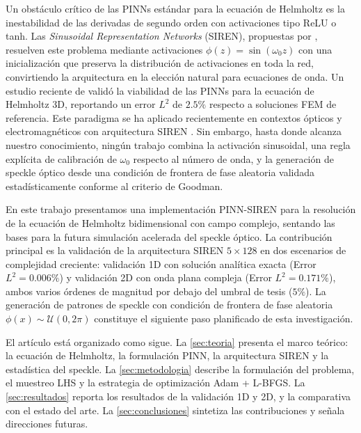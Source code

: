 Un obstáculo crítico de las PINNs estándar para la ecuación de Helmholtz es la inestabilidad
de las derivadas de segundo orden con activaciones tipo ReLU o tanh.
Las \textit{Sinusoidal Representation Networks} (SIREN), propuestas por
\citet{Sitzmann2020_SIREN}, resuelven este problema mediante activaciones
$\phi(z) = \sin(\omega_0 z)$ con una inicialización que preserva la distribución de
activaciones en toda la red, convirtiendo la arquitectura en la elección natural para
ecuaciones de onda.
Un estudio reciente de \citet{Schoder2024_PINN_acoustics} validó la viabilidad de las PINNs
para la ecuación de Helmholtz 3D, reportando un error $L^2$ de $2.5\%$ respecto a soluciones
FEM de referencia.
Este paradigma se ha aplicado recientemente en contextos ópticos y electromagnéticos con
arquitectura SIREN \citep{Panagiotakopoulos2026_Helmholtz}. Sin embargo, hasta donde alcanza
nuestro conocimiento, ningún trabajo combina la activación sinusoidal, una regla explícita de
calibración de $\omega_0$ respecto al número de onda, y la generación de speckle óptico desde
una condición de frontera de fase aleatoria validada estadísticamente conforme al criterio de
Goodman.

En este trabajo presentamos una implementación PINN-SIREN para la resolución de la ecuación
de Helmholtz bidimensional con campo complejo, sentando las bases para la futura simulación
acelerada del speckle óptico.
La contribución principal es la validación de la arquitectura SIREN $5\times128$ en dos
escenarios de complejidad creciente: validación 1D con solución analítica exacta
(Error $L^2 = 0.006\%$) y validación 2D con onda plana compleja (Error $L^2 = 0.171\%$),
ambos varios órdenes de magnitud por debajo del umbral de tesis ($5\%$).
La generación de patrones de speckle con condición de frontera de fase aleatoria
$\phi(x) \sim \mathcal{U}(0, 2\pi)$ constituye el siguiente paso planificado de esta investigación.

El artículo está organizado como sigue.
La \cref{sec:teoria} presenta el marco teórico: la ecuación de Helmholtz, la formulación PINN,
la arquitectura SIREN y la estadística del speckle.
La \cref{sec:metodologia} describe la formulación del problema, el muestreo LHS y la
estrategia de optimización Adam + L-BFGS.
La \cref{sec:resultados} reporta los resultados de la validación 1D y 2D, y la comparativa
con el estado del arte.
La \cref{sec:conclusiones} sintetiza las contribuciones y señala direcciones futuras.

